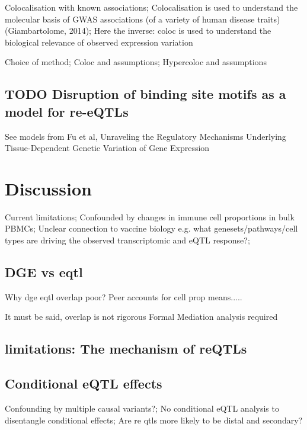 Colocalisation with known associations;
Colocalisation is used to understand the molecular basis of GWAS associations (of a variety of human disease traits) (Giambartolome, 2014);
Here the inverse: coloc is used to understand the biological relevance of observed expression variation

Choice of method; 
Coloc and assumptions; Hypercoloc and assumptions


\subsection{TODO Disruption of binding site motifs as a model for re-eQTLs}

See models from Fu et al, Unraveling the Regulatory Mechanisms Underlying Tissue-Dependent Genetic Variation of Gene Expression

\section{Discussion}

Current limitations;
Confounded by changes in immune cell proportions in bulk PBMCs;
Unclear connection to vaccine biology e.g. what genesets/pathways/cell types are driving the observed transcriptomic and eQTL response?;

\subsection{DGE vs eqtl}
Why dge eqtl overlap poor?
Peer accounts for cell prop means.....

It must be said, overlap is not rigorous
Formal Mediation analysis required

\subsection{limitations: The mechanism of reQTLs}

\subsection{Conditional eQTL effects}
Confounding by multiple causal variants?;
No conditional eQTL analysis to disentangle conditional effects;
Are re qtls more likely to be distal and secondary?

